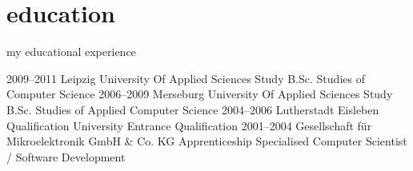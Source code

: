 \documentclass[]{friggeri-cv}
\begin{document}
\section{education}
my educational experience

\begin{entrylist}
  \entry
    {2009–2011}
    {Leipzig University Of Applied Sciences}
    {Study B.Sc.}
    {Studies of Computer Science}
  \entry
    {2006–2009}
    {Merseburg University Of Applied Sciences}
    {Study B.Sc.}
    {Studies of Applied Computer Science}
  \entry
    {2004–2006}
    {Lutherstadt Eisleben}
    {Qualification}
    {University Entrance Qualification}
  \entry
    {2001–2004}
    {Gesellschaft für Mikroelektronik GmbH \& Co. KG}
    {Apprenticeship}
    {Specialised Computer Scientist / Software Development}
\end{entrylist}


%
\end{document}
